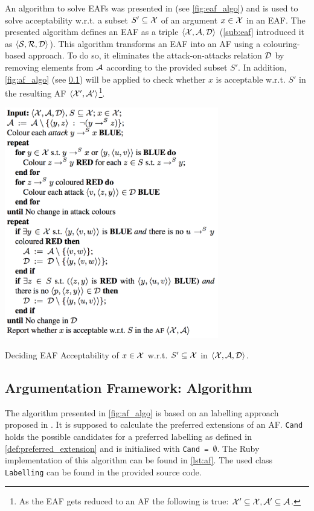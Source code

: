 An algorithm to solve \glspl{EAF} was presented in \cite{Dunne10computationin} (see \cref{fig:eaf_algo}) and is used to solve acceptability w.r.t. a subset $S' \subseteq \mathcal{X}$ of an argument $x \in \mathcal{X}$ in an \gls{EAF}. The presented algorithm defines an \gls{EAF} as a triple $\langle \mathcal{X}, \mathcal{A}, \mathcal{D} \rangle$ (\autoref{sub:eaf} introduced it as $\langle \mathcal{S}, \mathcal{R}, \mathcal{D} \rangle$).
This algorithm transforms an \gls{EAF} into an \gls{AF} using a colouring-based approach. To do so, it eliminates the attack-on-attacks relation $\mathcal{D}$ by removing elements from $\mathcal{A}$ according to the provided subset $S'$. In addition, \cref{fig:af_algo} (see \cref{sub:af_algorithm}) will be applied to check whether $x$ is acceptable w.r.t. $S'$ in the resulting AF $\langle \mathcal{X}', \mathcal{A}' \rangle$\footnote{As the \gls{EAF} gets reduced to an \gls{AF} the following is true: $\mathcal{X}' \subseteq \mathcal{X}, \mathcal{A}' \subseteq \mathcal{A}$.}.


\begin{algorithm}[htbp]
	\includegraphics[width=0.7\textwidth]{figures/eaf_algorithm}
	\caption{Deciding \gls{EAF} Acceptability of $x \in \mathcal{X}$ w.r.t. $S' \subseteq \mathcal{X}$ in $\langle \mathcal{X}, \mathcal{A}, \mathcal{D} \rangle$.}
	\label{fig:eaf_algo}
\end{algorithm}


\subsection{Argumentation Framework: Algorithm}
\label{sub:af_algorithm}

The algorithm presented in \cref{fig:af_algo} is based on an labelling approach proposed in \cite{Modgil2009Proof, rodrigues}. It is supposed to calculate the preferred extensions of an \gls{AF}. \texttt{Cand} holds the possible candidates for a preferred labelling as defined in \cref{def:preferred_extension} and is initialised with \texttt{Cand = $\emptyset$}. The Ruby implementation of this algorithm can be found in \cref{lst:af}. The used class \texttt{Labelling} can be found in the provided source code. 

